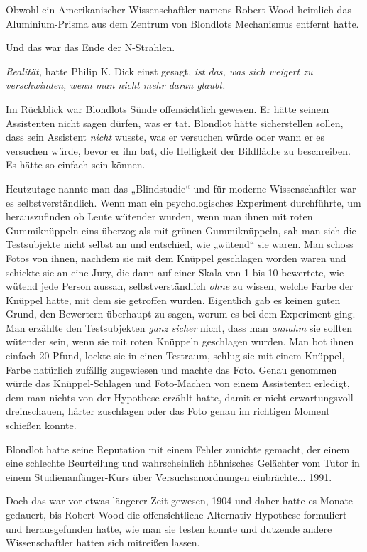 {Obwohl ein Amerikanischer Wissenschaftler namens Robert Wood heimlich das Aluminium-Prisma aus dem Zentrum von Blondlots Mechanismus entfernt hatte.

Und das war das Ende der N-Strahlen.

\emph{Realität,} hatte Philip K. Dick einst gesagt, \emph{ist das, was sich weigert zu verschwinden, wenn man nicht mehr daran glaubt.}

Im Rückblick war Blondlots Sünde offensichtlich gewesen. Er hätte seinem Assistenten nicht sagen dürfen, was er tat. Blondlot hätte sicherstellen sollen, dass sein Assistent \emph{nicht} wusste, was er versuchen würde oder wann er es versuchen würde, bevor er ihn bat, die Helligkeit der Bildfläche zu beschreiben. Es hätte so einfach sein können.

Heutzutage nannte man das „Blindstudie“ und für moderne Wissenschaftler war es selbstverständlich. Wenn man ein psychologisches Experiment durchführte, um herauszufinden ob Leute wütender wurden, wenn man ihnen mit roten Gummiknüppeln eins überzog als mit grünen Gummiknüppeln, sah man sich die Testsubjekte nicht selbst an und entschied, wie „wütend“ sie waren. Man schoss Fotos von ihnen, nachdem sie mit dem Knüppel geschlagen worden waren und schickte sie an eine Jury, die dann auf einer Skala von 1 bis 10 bewertete, wie wütend jede Person aussah, selbstverständlich \emph{ohne} zu wissen, welche Farbe der Knüppel hatte, mit dem sie getroffen wurden. Eigentlich gab es keinen guten Grund, den Bewertern überhaupt zu sagen, worum es bei dem Experiment ging. Man erzählte den Testsubjekten \emph{ganz sicher} nicht, dass man \emph{annahm} sie sollten wütender sein, wenn sie mit roten Knüppeln geschlagen wurden. Man bot ihnen einfach 20 Pfund, lockte sie in einen Testraum, schlug sie mit einem Knüppel, Farbe natürlich zufällig zugewiesen und machte das Foto. Genau genommen würde das Knüppel-Schlagen und Foto-Machen von einem Assistenten erledigt, dem man nichts von der Hypothese erzählt hatte, damit er nicht erwartungsvoll dreinschauen, härter zuschlagen oder das Foto genau im richtigen Moment schießen konnte.

Blondlot hatte seine Reputation mit einem Fehler zunichte gemacht, der einem eine schlechte Beurteilung und wahrscheinlich höhnisches Gelächter vom Tutor in einem Studienanfänger-Kurs über Versuchsanordnungen einbrächte... 1991.

Doch das war vor etwas längerer Zeit gewesen, 1904 und daher hatte es Monate gedauert, bis Robert Wood die offensichtliche Alternativ-Hypothese formuliert und herausgefunden hatte, wie man sie testen konnte und dutzende andere Wissenschaftler hatten sich mitreißen lassen.

}

